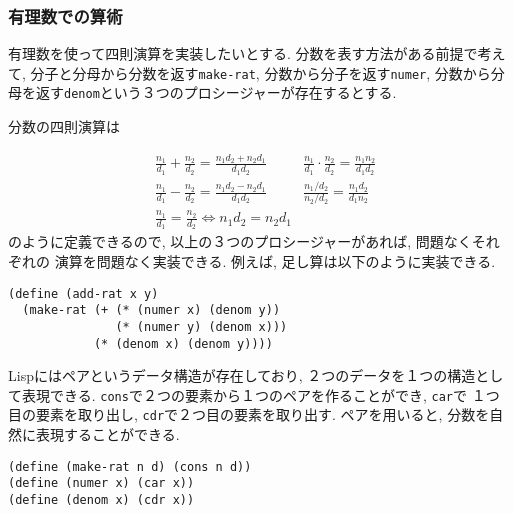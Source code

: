 \subsubsection{有理数での算術}
有理数を使って四則演算を実装したいとする. 分数を表す方法がある前提で考えて,
分子と分母から分数を返す\lstinline{make-rat}, 分数から分子を返す\lstinline{numer},
分数から分母を返す\lstinline{denom}という３つのプロシージャーが存在するとする.

分数の四則演算は

\begin{align*}
  &\frac{n_1}{d_1} + \frac{n_2}{d_2}  = \frac{n_1d_2 + n_2d_1}{d_1d_2}
  & \frac{n_1}{d_1}\cdot \frac{n_2}{d_2} = \frac{n_1n_2}{d_1d_2}\\
  &\frac{n_1}{d_1} - \frac{n_2}{d_2} = \frac{n_1d_2 - n_2d_1}{d_1d_2}
  & \frac{n_1/d_2}{n_2/d_2} = \frac{n_1d_2}{d_1n_2}\\
  &\frac{n_1}{d_1} = \frac{n_2}{d_2} \Leftrightarrow n_1d_2 = n_2d_1
\end{align*}
\noindent
のように定義できるので, 以上の３つのプロシージャーがあれば, 問題なくそれぞれの
演算を問題なく実装できる. 例えば, 足し算は以下のように実装できる.

\begin{lstlisting}[basicstyle=\footnotesize,title=分数の足し算]
(define (add-rat x y)
  (make-rat (+ (* (numer x) (denom y))
               (* (numer y) (denom x)))
            (* (denom x) (denom y))))
\end{lstlisting}
\vspace{5mm}

Lispにはペアというデータ構造が存在しており, ２つのデータを１つの構造として表現できる.
\lstinline{cons}で２つの要素から１つのペアを作ることができ, \lstinline{car}で
１つ目の要素を取り出し, \lstinline{cdr}で２つ目の要素を取り出す.
ペアを用いると, 分数を自然に表現することができる.

\begin{lstlisting}[basicstyle=\footnotesize,title=分数の表現]
(define (make-rat n d) (cons n d))
(define (numer x) (car x))
(define (denom x) (cdr x))
\end{lstlisting}
